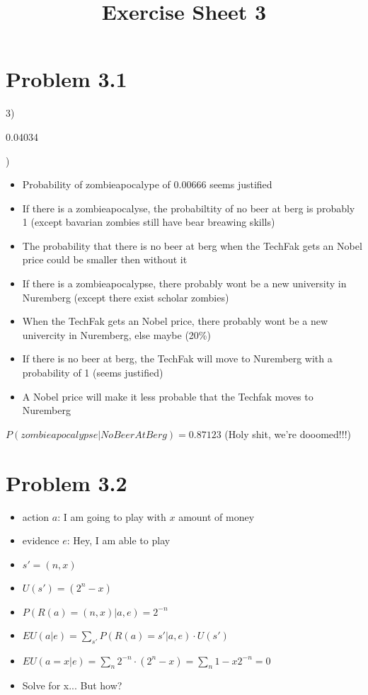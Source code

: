 \documentclass[a4paper]{article}
\title{Exercise Sheet 3}
\begin{document}
\maketitle

\section*{Problem 3.1}
3)

0.04034

)
\begin{itemize}
    \item
        Probability of zombieapocalype of $0.00666$ seems justified
    \item
        If there is a zombieapocalyse, the probabiltity of no beer at berg is probably 1 (except bavarian zombies still have bear breawing skills)
    \item
        The probability that there is no beer at berg when the TechFak gets an Nobel price could be smaller then without it
    \item
        If there is a zombieapocalypse, there probably wont be a new university in Nuremberg (except there exist scholar zombies)
    \item
        When the TechFak gets an Nobel price, there probably wont be a new univercity in Nuremberg, else maybe (20\%)
    \item
        If there is no beer at berg, the TechFak will move to Nuremberg with a probability of 1 (seems justified)
    \item
        A Nobel price will make it less probable that the Techfak moves to Nuremberg
\end{itemize}

$P(zombieapocalypse | NoBeerAtBerg) = 0.87123$ (Holy shit, we're dooomed!!!)

\section*{Problem 3.2}
\begin{itemize}
    \item
        action $a$: I am going to play with $x$ amount of money
    \item
        evidence $e$: Hey, I am able to play
    \item
        $s' = (n, x)$
    \item
        $U(s') = (2^n - x)$
    \item
        $P(R(a) = (n,x) | a,e) = 2^{-n}$
    \item
        $EU(a|e) = \sum_{s'} P(R(a) = s' | a,e) \cdot U(s')$
    \item
        $EU(a = x|e) = \sum_{n} 2^{-n} \cdot (2^n - x) = \sum_{n}1 - x 2^{-n} = 0$
    \item
        Solve for x... But how?
\end{itemize}
\end{document}
